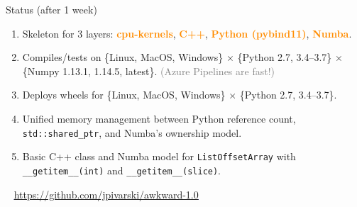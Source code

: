 \documentclass[aspectratio=169]{beamer}
\begin{document}
\begin{frame}{Status (after 1 week)}
\vspace{0.5 cm}
\large
\begin{enumerate}\setlength{\itemsep}{0.35 cm}
\item Skeleton for 3 layers: \textcolor{darkorange}{\bf cpu-kernels}, \textcolor{darkorange}{\bf C++}, \textcolor{darkorange}{\bf Python (pybind11)}, \textcolor{darkorange}{\bf Numba}.
\item Compiles/tests on \{Linux, MacOS, Windows\} $\times$ \{Python 2.7, 3.4--3.7\} $\times$ \{Numpy 1.13.1, 1.14.5, latest\}. \textcolor{gray}{(Azure Pipelines are fast!)}
\item Deploys wheels for \{Linux, MacOS, Windows\} $\times$ \{Python 2.7, 3.4--3.7\}.
\item Unified memory management between Python reference count, \texttt{std::shared_ptr}, and Numba's ownership model.
\item Basic C++ class and Numba model for \texttt{ListOffsetArray} with \texttt{__getitem__(int)} and \texttt{__getitem__(slice)}.
\end{enumerate}

\vspace{0.5 cm}
\mbox{ } \hfill \textcolor{blue}{\underline{\url{https://github.com/jpivarski/awkward-1.0}}} \hfill \mbox{ }
\end{frame}
\end{document}

